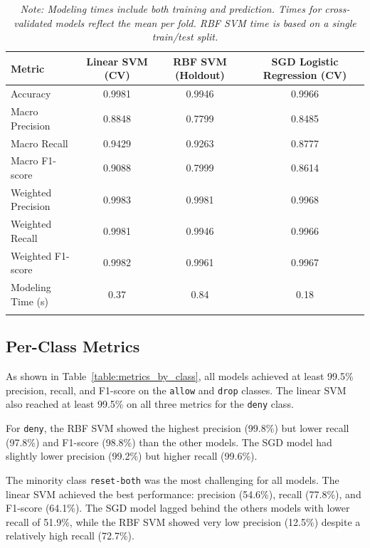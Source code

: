\documentclass{article}      %
\begin{document}
\begin{table}[h!]
    \centering
    \caption{Overall Classification Metrics and Modeling Time by Model}
    \begin{tabular}{lccc}
    \arrayrulecolor{black}
    \toprule
    \textbf{Metric} & \textbf{Linear SVM (CV)} & \textbf{RBF SVM (Holdout)} & \textbf{SGD Logistic Regression (CV)} \\
    \midrule
    \arrayrulecolor{lightgray}
    Accuracy              & 0.9981 & 0.9946 & 0.9966 \\
    Macro Precision       & 0.8848 & 0.7799 & 0.8485 \\
    Macro Recall          & 0.9429 & 0.9263 & 0.8777 \\
    Macro F1-score        & 0.9088 & 0.7999 & 0.8614 \\
    Weighted Precision    & 0.9983 & 0.9981 & 0.9968 \\
    Weighted Recall       & 0.9981 & 0.9946 & 0.9966 \\
    Weighted F1-score     & 0.9982 & 0.9961 & 0.9967 \\
    Modeling Time (s)     & 0.37   & 0.84   & 0.18 \\
    \arrayrulecolor{black}
    \bottomrule
    \end{tabular}
    \vspace{0.5em}
    \caption*{\small\textit{Note: Modeling times include both training and prediction. Times for cross-validated models reflect the mean per fold. RBF SVM time is based on a single train/test split.}}
    \label{table:metrics_overall}
\end{table}
   
\subsection{Per-Class Metrics}

As shown in Table~\ref{table:metrics_by_class}, all models achieved at least 99.5\% precision, recall, and F1-score on the \texttt{allow} and \texttt{drop} classes. The linear SVM also reached at least 99.5\% on all three metrics for the \texttt{deny} class.

For \texttt{deny}, the RBF SVM showed the highest precision (99.8\%) but lower recall (97.8\%) and F1-score (98.8\%) than the other models. The SGD model had slightly lower precision (99.2\%) but higher recall (99.6\%).

The minority class \texttt{reset-both} was the most challenging for all models. The linear SVM achieved the best performance: precision (54.6\%), recall (77.8\%), and F1-score (64.1\%). The SGD model lagged behind the others models with lower recall of 51.9\%, while the RBF SVM showed very low precision (12.5\%) despite a relatively high recall (72.7\%).
\end{document}
